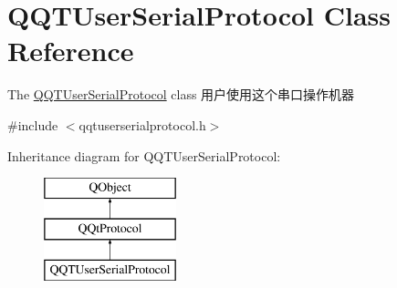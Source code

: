 \hypertarget{class_q_q_t_user_serial_protocol}{}\section{Q\+Q\+T\+User\+Serial\+Protocol Class Reference}
\label{class_q_q_t_user_serial_protocol}


The \mbox{\hyperlink{class_q_q_t_user_serial_protocol}{Q\+Q\+T\+User\+Serial\+Protocol}} class 用户使用这个串口操作机器  




{\ttfamily \#include $<$qqtuserserialprotocol.\+h$>$}

Inheritance diagram for Q\+Q\+T\+User\+Serial\+Protocol\+:\begin{figure}[H]
\begin{center}
\leavevmode
\includegraphics[height=3.000000cm]{class_q_q_t_user_serial_protocol}
\end{center}
\end{figure}

